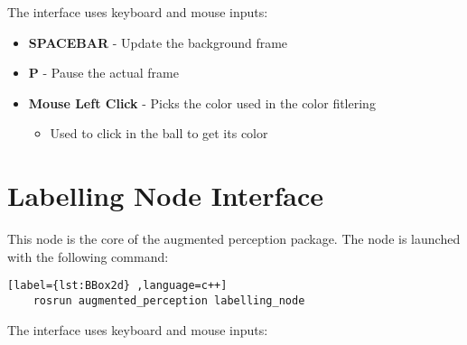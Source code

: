 The interface uses keyboard and mouse inputs:

\begin{itemize}
	\item \textbf{SPACEBAR} - Update the background frame
	\item \textbf{P} - Pause the actual frame
	\item \textbf{Mouse Left Click} - Picks the color used in the color fitlering
	\begin{itemize}
		\item Used to click in the ball to get its color
	\end{itemize}
\end{itemize}

\section{Labelling Node Interface}

This node is the core of the augmented perception package. The node is launched with the following command:

\begin{center}
	\begin{lstlisting}[label={lst:BBox2d} ,language=c++]
	rosrun augmented_perception labelling_node\end{lstlisting}
\end{center}

The interface uses keyboard and mouse inputs:

